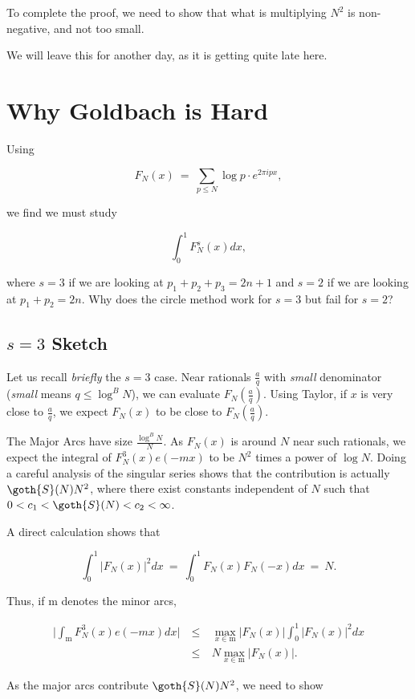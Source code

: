 \documentclass[12pt,letterpaper]{report}
\newcommand\be{\begin{equation}}
\newcommand\ee{\end{equation}}
\newcommand\bea{\begin{eqnarray}}
\newcommand\eea{\end{eqnarray}}
\begin{document}
To complete the proof, we need to show that what is multiplying
$N^2$ is non-negative, and not too small.

We will leave this for another day, as it is getting quite late
here.



\section{Why Goldbach is Hard}

Using

\be F_N(x) \ = \ \sum_{p \le N} \log p \cdot e^{2\pi i px}, \ee

we find we must study

\be \int_0^1 F_N^s(x)dx, \ee

where $s = 3$ if we are looking at $p_1 + p_2 + p_3 = 2n+1$ and $s
= 2$ if we are looking at $p_1 + p_2 = 2n$. Why does the circle
method work for $s = 3$ but fail for $s = 2$?

\subsection{$s = 3$ Sketch}

Let us recall \emph{briefly} the $s = 3$ case. Near rationals
$\frac{a}{q}$ with \emph{small} denominator (\emph{small} means $q
\le \log^B N$), we can evaluate $F_N(\frac{a}{q})$. Using Taylor,
if $x$ is very close to $\frac{a}{q}$, we expect $F_N(x)$ to be
close to $F_N(\frac{a}{q})$.

The Major Arcs have size $\frac{\log^B N}{N}$. As $F_N(x)$ is
around $N$ near such rationals, we expect the integral of
$F_N^3(x) e(-mx)$ to be $N^2$ times a power of $\log N$. Doing a
careful analysis of the singular series shows that the
contribution is actually $\goth{S}(N) N^2$, where there exist
constants independent of $N$ such that $0 < c_1 < \goth{S}(N) <
c_2 < \infty$.


A direct calculation shows that

\be\label{eqfnsquaredisN} \int_0^1 |F_N(x)|^2dx \ = \ \int_0^1
F_N(x) F_N(-x)dx \ = \ N. \ee

Thus, if $\mathrm{m}$ denotes the minor arcs,

\bea \Big|\int_{\mathrm{m}} F_N^3(x)e(-mx)dx \Big| & \ \le \ &
\max_{x \in \mathrm{m}} |F_N(x)| \int_0^1 |F_N(x)|^2dx\nonumber\\
& \ \le \ & N \max_{x \in \mathrm{m}} |F_N(x)|. \eea

As the major arcs contribute $\goth{S}(N) N^2$, we need to show
\end{document}
